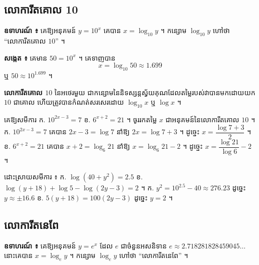 \subsection{លោការីតគោល 10}
\textbf{ឧទាហរណ៍ ៖} គេឱ្យអនុគមន៍ $y = 10^x$ គេបាន $x = \log_{10} y$ ។ កន្សោម $\log_{10} y$ ហៅថា “លោការីតគោល $10$” ។

\textbf{សង្កេត ៖} គេមាន $50 = 10^x$ ។ គេទាញបាន
\[
x = \log_{10} 50 \approx 1.699
\]
ឬ $50 \approx 10^{1.699}$ ។
\begin{center}
\end{center}

\begin{definition}[និយមន័យ]
\textbf{លោការីតគោល $10$} នៃអថេរមួយ ជាកន្សោមនៃនិទស្សន្តស្វ័យគុណដែលតម្លៃរបស់វាបានមកដោយយក $10$ ជាគោល ហើយត្រូវបានកំណត់សរសេរដោយ $\log_{10} x$ ឬ $\log x$ ។
\end{definition}

\begin{example}[លំហាត់គំរូ]
គេឱ្យសមីការ ក. $10^{2x - 3} = 7$ \quad ខ. $6^{x + 2} = 21$ ។ ចូររកតម្លៃ $x$ ជាអនុគមន៍នៃលោការីតគោល $10$ ។
\ans
ក. $10^{2x - 3} = 7$ គេបាន $2x - 3 = \log 7$ នាំឱ្យ $2x = \log 7 + 3$ ។ ដូច្នេះ $x = \dfrac{\log 7 + 3}{2}$ ។\\
ខ. $6^{x + 2} = 21$ គេបាន $x + 2 = \log_6 21$ នាំឱ្យ $x = \log_6 21 - 2$ ។ ដូច្នេះ $x = \dfrac{\log 21}{\log 6} - 2$ ។
\end{example}

\begin{pro}
ដោះស្រាយសមីការ ៖ \quad ក. $\log(40 + y^2) = 2.5$ \quad ខ. $\log(y + 18) + \log 5 - \log(2y - 3) = 2$ ។
\ans
ក. $y^2 = 10^{2.5} - 40 \approx 276.23$ ដូច្នេះ $y \approx \pm 16.6$ \quad ខ. $5(y + 18) = 100(2y - 3)$ ដូច្នេះ $y = 2$ ។
\end{pro}

\subsection{លោការីតនេពែ}
\textbf{ឧទាហរណ៍ ៖} គេឱ្យអនុគមន៍ $y = e^x$ ដែល $e$ ជាចំនួនអសនិទាន $e \approx 2.718281828459045\ldots$ នោះគេបាន $x = \log_e y$ ។ កន្សោម $\log_e y$ ហៅថា “លោការីតនេពែ” ។

